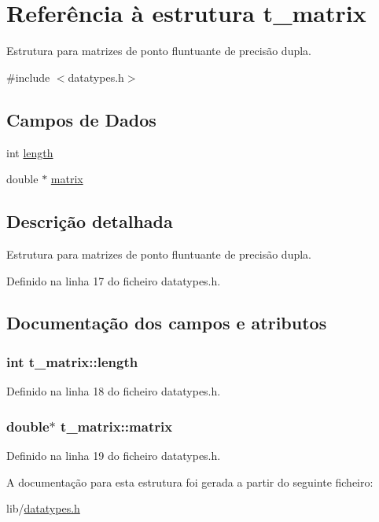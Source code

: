 \hypertarget{structt__matrix}{}\section{Referência à estrutura t\+\_\+matrix}
\label{structt__matrix}


Estrutura para matrizes de ponto fluntuante de precisão dupla.  




{\ttfamily \#include $<$datatypes.\+h$>$}

\subsection*{Campos de Dados}
\begin{DoxyCompactItemize}
\item 
int \hyperlink{structt__matrix_a6eddae351b94b73e4d9e5956fb36fe87}{length}
\item 
double $\ast$ \hyperlink{structt__matrix_a15b28448e09b3475e0d01262e6b77ed9}{matrix}
\end{DoxyCompactItemize}


\subsection{Descrição detalhada}
Estrutura para matrizes de ponto fluntuante de precisão dupla. 

Definido na linha 17 do ficheiro datatypes.\+h.



\subsection{Documentação dos campos e atributos}
\subsubsection[{\texorpdfstring{length}{length}}]{\setlength{\rightskip}{0pt plus 5cm}int t\+\_\+matrix\+::length}\hypertarget{structt__matrix_a6eddae351b94b73e4d9e5956fb36fe87}{}\label{structt__matrix_a6eddae351b94b73e4d9e5956fb36fe87}


Definido na linha 18 do ficheiro datatypes.\+h.

\subsubsection[{\texorpdfstring{matrix}{matrix}}]{\setlength{\rightskip}{0pt plus 5cm}double$\ast$ t\+\_\+matrix\+::matrix}\hypertarget{structt__matrix_a15b28448e09b3475e0d01262e6b77ed9}{}\label{structt__matrix_a15b28448e09b3475e0d01262e6b77ed9}


Definido na linha 19 do ficheiro datatypes.\+h.



A documentação para esta estrutura foi gerada a partir do seguinte ficheiro\+:\begin{DoxyCompactItemize}
\item 
lib/\hyperlink{datatypes_8h}{datatypes.\+h}\end{DoxyCompactItemize}
